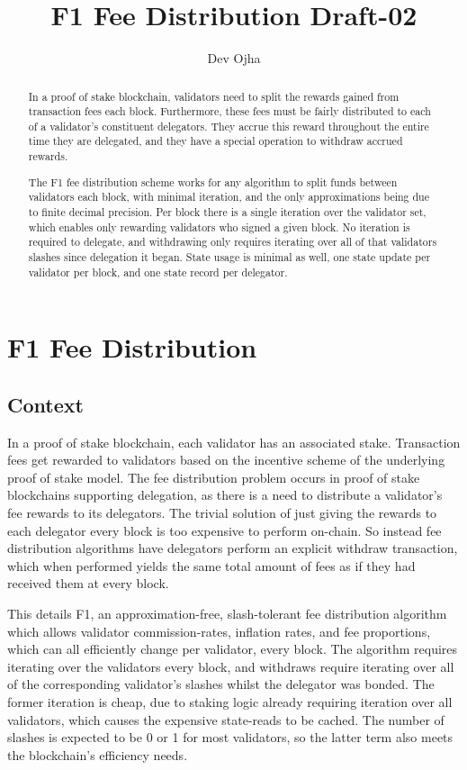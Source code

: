 \documentclass[]{article}
\title{F1 Fee Distribution Draft-02}
\author{Dev Ojha}
\begin{document}
\maketitle

\begin{abstract}
	In a proof of stake blockchain, validators need to split the rewards gained from transaction fees each block. Furthermore, these fees must be fairly distributed to each of a validator's constituent delegators. They accrue this reward throughout the entire time they are delegated, and they have a special operation to withdraw accrued rewards.
	
	The F1 fee distribution scheme works for any algorithm to split funds between validators each block, with minimal iteration, and the only approximations being due to finite decimal precision. Per block there is a single iteration over the validator set, which enables only rewarding validators who signed a given block. No iteration is required to delegate, and withdrawing only requires iterating over all of that validators slashes since delegation it began. State usage is minimal as well, one state update per validator per block, and one state record per delegator.
\end{abstract}

\section{F1 Fee Distribution}

\subsection{Context}
In a proof of stake blockchain, each validator has an associated stake.
Transaction fees get rewarded to validators based on the incentive scheme of the underlying proof of stake model.
The fee distribution problem occurs in proof of stake blockchains supporting delegation, as there is a need to distribute a validator's fee rewards to its delegators.
The trivial solution of just giving the rewards to each delegator every block is too expensive to perform on-chain.
So instead fee distribution algorithms have delegators perform an explicit withdraw transaction, which when performed yields the same total amount of fees as if they had received them at every block. 

This details F1, an approximation-free, slash-tolerant fee distribution algorithm which allows validator commission-rates, inflation rates, and fee proportions, which can all efficiently change per validator, every block.
The algorithm requires iterating over the validators every block, and withdraws require iterating over all of the corresponding validator's slashes whilst the delegator was bonded.
The former iteration is cheap, due to staking logic already requiring iteration over all validators, which causes the expensive state-reads to be cached.
The number of slashes is expected to be 0 or 1 for most validators,
so the latter term also meets the blockchain's efficiency needs.
\end{document}
